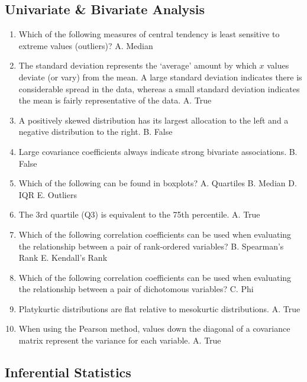 \documentclass[]{book}
\begin{document}
\hypertarget{univariate-bivariate-analysis}{%
\subsection{Univariate \& Bivariate Analysis}\label{univariate-bivariate-analysis}}

\begin{enumerate}
\def\labelenumi{\arabic{enumi}.}
\item
  Which of the following measures of central tendency is least sensitive to extreme values (outliers)?
  A. Median
\item
  The standard deviation represents the `average' amount by which \(x\) values deviate (or vary) from the mean. A large standard deviation indicates there is considerable spread in the data, whereas a small standard deviation indicates the mean is fairly representative of the data.
  A. True
\item
  A positively skewed distribution has its largest allocation to the left and a negative distribution to the right.
  B. False
\item
  Large covariance coefficients always indicate strong bivariate associations.
  B. False
\item
  Which of the following can be found in boxplots?
  A. Quartiles
  B. Median
  D. IQR
  E. Outliers
\item
  The 3rd quartile (Q3) is equivalent to the 75th percentile.
  A. True
\item
  Which of the following correlation coefficients can be used when evaluating the relationship between a pair of rank-ordered variables?
  B. Spearman's Rank
  E. Kendall's Rank
\item
  Which of the following correlation coefficients can be used when evaluating the relationship between a pair of dichotomous variables?
  C. Phi
\item
  Platykurtic distributions are flat relative to mesokurtic distributions.
  A. True
\item
  When using the Pearson method, values down the diagonal of a covariance matrix represent the variance for each variable.
  A. True
\end{enumerate}

\hypertarget{inferential-statistics}{%
\subsection{Inferential Statistics}\label{inferential-statistics}}
\end{document}
